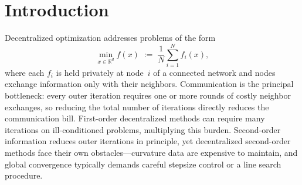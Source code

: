 \documentclass[10pt,twocolumn,letterpaper]{article}
\theoremstyle{compact}
\theoremstyle{compactremark}
\newcommand{\R}{\mathbb{R}}
\begin{document}
	\section{Introduction}
	Decentralized optimization addresses problems of the form
	\begin{equation}\label{eq:intro_prob}
		\min_{x\in\R^d} f(x)\;:=\;\frac{1}{N}\sum_{i=1}^N f_i(x),
	\end{equation}
	where each $f_i$ is held privately at node~$i$ of a connected network
	and nodes exchange information only with their neighbors.
	Communication is the principal bottleneck: every outer iteration
	requires one or more rounds of costly neighbor exchanges, so
	reducing the total number of iterations directly reduces the
	communication bill.
	First-order decentralized methods can require many iterations on
	ill-conditioned problems, multiplying this burden.
	Second-order information reduces outer iterations in principle,
	yet decentralized second-order methods face their own
	obstacles---curvature data are expensive to maintain, and global
	convergence typically demands careful stepsize control or a
	line search procedure.
	
\end{document}
